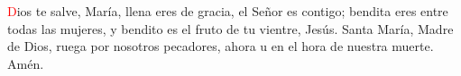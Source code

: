 \textcolor{red}{D}ios te salve, María, llena eres de gracia, el Señor es contigo; bendita eres entre todas las mujeres,
y bendito es el fruto de tu vientre, Jesús. Santa María, Madre de Dios, ruega por nosotros pecadores,
ahora u en el hora de nuestra muerte. Amén.